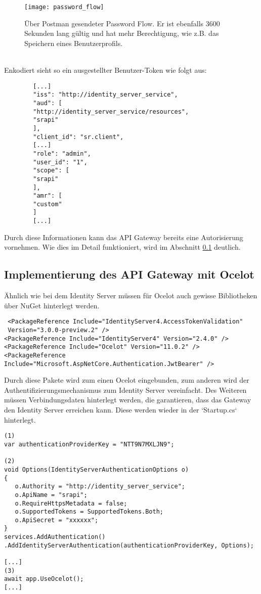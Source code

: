 \begin{figure}[!ht]
	\centering
	\texttt{[image: password\_flow]}
	\caption[Über Postman gesendeter Password Flow] {Über Postman gesendeter Password Flow. Er ist ebenfalls 3600 Sekunden lang gültig und hat mehr Berechtigung, wie z.B. das Speichern eines Benutzerprofils.}
	\label{fig:password_flow}
\end{figure} \\

Enkodiert sieht so ein ausgestellter Benutzer-Token wie folgt aus: \\

\begin{verbatim}
		[...]
		"iss": "http://identity_server_service",
		"aud": [
		"http://identity_server_service/resources",
		"srapi"
		],
		"client_id": "sr.client",
		[...]
		"role": "admin",
		"user_id": "1",
		"scope": [
		"srapi"
		],
		"amr": [
		"custom"
		]
		[...]
\end{verbatim}  

Durch diese Informationen kann das API Gateway bereits eine Autorisierung vornehmen. Wie dies im Detail funktioniert, wird im Abschnitt \ref{sec:umsetzung_api_gateway} deutlich. 

\subsection{Implementierung des API Gateway mit Ocelot}\label{sec:umsetzung_api_gateway}

Ähnlich wie bei dem Identity Server müssen für Ocelot auch gewisse Bibliotheken über NuGet hinterlegt werden.

\begin{verbatim}
 <PackageReference Include="IdentityServer4.AccessTokenValidation" 
 Version="3.0.0-preview.2" />
<PackageReference Include="IdentityServer4" Version="2.4.0" />
<PackageReference Include="Ocelot" Version="11.0.2" />
<PackageReference Include="Microsoft.AspNetCore.Authentication.JwtBearer" />
\end{verbatim}

Durch diese Pakete wird zum einen Ocelot eingebunden, zum anderen wird der Authentifizierungsmechanismus zum Identity Server vereinfacht. Des Weiteren müssen Verbindungsdaten hinterlegt werden, die garantieren, dass das Gateway den Identity Server erreichen kann. Diese werden wieder in der `Startup.cs` hinterlegt.

\begin{verbatim}
(1)
var authenticationProviderKey = "NTT9N7MXLJN9";

(2)
void Options(IdentityServerAuthenticationOptions o)
{
   o.Authority = "http://identity_server_service";
   o.ApiName = "srapi";
   o.RequireHttpsMetadata = false;
   o.SupportedTokens = SupportedTokens.Both;
   o.ApiSecret = "xxxxxx";
}
services.AddAuthentication()
.AddIdentityServerAuthentication(authenticationProviderKey, Options);

[...]
(3)
await app.UseOcelot();
[...]
\end{verbatim}

